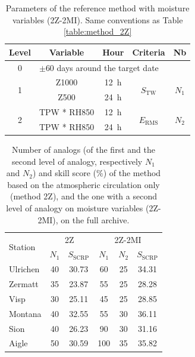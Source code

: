\documentclass[hess, manuscript]{copernicus}
\begin{document}
\begin{table}[htb]
	\caption{Parameters of the reference method with moisture variables (2Z-2MI). Same conventions as Table \ref{table:method_2Z}}
	\footnotesize
	\begin{center}
		\begin{tabular}{ccccc}
			\hline 
			Level & Variable & Hour & Criteria & Nb \\ 
			\hline 
			0 & \multicolumn{4}{l}{$\pm 60$ days around the target date} \\
			\hline 
			\multirow{2}{*}{1} & Z1000 & 12~h & \multirow{2}{*}{$S_{\text{TW}}$} & \multirow{2}{*}{$N_{1}$} \\
			& Z500 & 24~h & & \\ 
			\hline
			\multirow{2}{*}{2} & TPW * RH850 & 12~h & \multirow{2}{*}{$E_{\text{RMS}}$} & \multirow{2}{*}{$N_{2}$} \\
			& TPW * RH850 & 24~h & & \\ 
			\hline 
		\end{tabular} 
	\end{center}
	\label{table:method_2Z-2MI}
\end{table}

\begin{table}[htb]
	\caption{Number of analogs (of the first and the second level of analogy, respectively $N_{1}$ and $N_{2}$) and skill score (\%) of the method based on the atmospheric circulation only (method 2Z), and the one with a second level of analogy on moisture variables (2Z-2MI), on the full archive.}
	\begin{center}
		\begin{tabular}{l c c c c c }
			\hline
			\multirow{2}{*}{Station} & \multicolumn{2}{c}{2Z} & \multicolumn{3}{c}{2Z-2MI} \\
			& $N_{1}$ & $S_{\text{SCRP}}$ & $N_{1}$ & $N_{2}$ & $S_{\text{SCRP}}$ \\ 
			\hline
			Ulrichen & 40 & 30.73 & 60 & 25 & 34.31 \\
			Zermatt & 35 & 23.87 & 55 & 25 & 28.28 \\
			Visp & 30 & 25.11 & 45 & 25 & 28.85 \\
			Montana & 40 & 32.55 & 55 & 30 & 36.11 \\
			Sion & 40 & 26.23 & 90 & 30 & 31.16 \\
			Aigle & 50 & 30.59 & 100 & 35 & 35.82 \\ 
			\hline
		\end{tabular}
	\end{center}	
	\label{table:performance}
\end{table}
\end{document}
